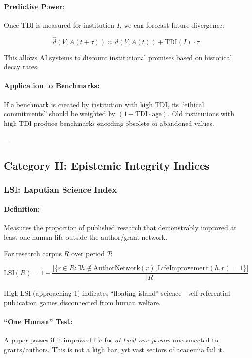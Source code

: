 \documentclass[11pt,a4paper]{article}
\theoremstyle{definition}
\theoremstyle{remark}
\begin{document}
\paragraph{Predictive Power:}
Once TDI is measured for institution $I$, we can forecast future divergence:

\[
\hat{d}(V, A(t + \tau)) \approx d(V, A(t)) + \text{TDI}(I) \cdot \tau
\]

This allows AI systems to discount institutional promises based on historical decay rates.

\paragraph{Application to Benchmarks:}
If a benchmark is created by institution with high TDI, its ``ethical commitments'' should be weighted by $(1 - \text{TDI} \cdot \text{age})$. Old institutions with high TDI produce benchmarks encoding obsolete or abandoned values.

---

\subsection{Category II: Epistemic Integrity Indices}

\subsubsection{LSI: Laputian Science Index}

\paragraph{Definition:}
Measures the proportion of published research that demonstrably improved at least one human life outside the author/grant network.

For research corpus $R$ over period $T$:

\[
\text{LSI}(R) = 1 - \frac{|\{r \in R : \exists h \notin \text{AuthorNetwork}(r), \text{LifeImprovement}(h, r) = 1\}|}{|R|}
\]

High LSI (approaching 1) indicates ``floating island'' science—self-referential publication games disconnected from human welfare.

\paragraph{``One Human'' Test:}
A paper passes if it improved life for \textit{at least one person} unconnected to grants/authors. This is not a high bar, yet vast sectors of academia fail it.
\end{document}
